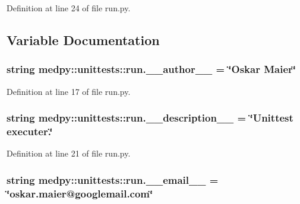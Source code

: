 Definition at line 24 of file run.py.



\subsection{Variable Documentation}
\hypertarget{namespacemedpy_1_1unittests_1_1run_a1008df3b424aaf12c93ccc46b403f7b9}{
\subsubsection[{\_\-\_\-author\_\-\_\-}]{\setlength{\rightskip}{0pt plus 5cm}string {\bf medpy::unittests::run.\_\-\_\-author\_\-\_\-} = \char`\"{}Oskar Maier\char`\"{}}}
\label{namespacemedpy_1_1unittests_1_1run_a1008df3b424aaf12c93ccc46b403f7b9}


Definition at line 17 of file run.py.

\hypertarget{namespacemedpy_1_1unittests_1_1run_a0c4b1c52458925d65130b50f76051873}{
\subsubsection[{\_\-\_\-description\_\-\_\-}]{\setlength{\rightskip}{0pt plus 5cm}string {\bf medpy::unittests::run.\_\-\_\-description\_\-\_\-} = \char`\"{}Unittest executer.\char`\"{}}}
\label{namespacemedpy_1_1unittests_1_1run_a0c4b1c52458925d65130b50f76051873}


Definition at line 21 of file run.py.

\hypertarget{namespacemedpy_1_1unittests_1_1run_acedb1d513d9f85f89616ded18309e7fd}{
\subsubsection[{\_\-\_\-email\_\-\_\-}]{\setlength{\rightskip}{0pt plus 5cm}string {\bf medpy::unittests::run.\_\-\_\-email\_\-\_\-} = \char`\"{}oskar.maier@googlemail.com\char`\"{}}}
\label{namespacemedpy_1_1unittests_1_1run_acedb1d513d9f85f89616ded18309e7fd}



